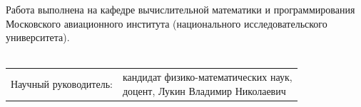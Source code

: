 \documentclass{.local/lib/classes/ndvr-super-article-standalone}
\begin{document}
    \begin{titlepage}
        \noindent 
        Работа выполнена 
        на кафедре вычислительной математики и программирования 
        Московского авиационного института 
        (национального исследовательского университета).\\
        \vspace{14pt}\\
        \begin{tabularx}{\textwidth}{lX}
            Научный руководитель:  & 
                \parbox[t]{\textwidth}{
                    кандидат физико-математических наук,\\
                    доцент, Лукин Владимир Николаевич \\
                } \\
            \vspace{0.013\paperheight}\\


\end{tabularx}
\end{titlepage}
\end{document}

